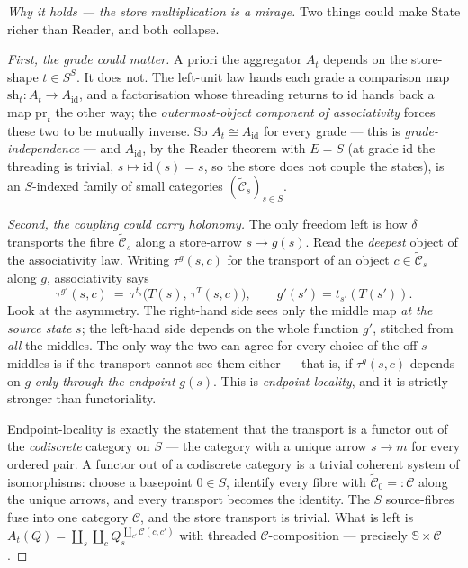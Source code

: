 \documentclass[11pt,a4paper]{book}
\newcommand{\id}{\mathrm{id}}
\theoremstyle{plain}
\theoremstyle{definition}
\theoremstyle{remark}
\begin{document}
\begin{proof}[Why it holds --- the store multiplication is a mirage]
Two things could make State richer than Reader, and both collapse.

\emph{First, the grade could matter.} A priori the aggregator $A_{t}$ depends on the store-shape
$t\in S^{S}$. It does not. The left-unit law hands each grade a comparison map
$\mathrm{sh}_{t}\colon A_{t}\to A_{\id}$, and a factorisation whose threading returns to $\id$ hands
back a map $\mathrm{pr}_{t}$ the other way; the \emph{outermost-object component of associativity}
forces these two to be mutually inverse. So $A_{t}\cong A_{\id}$ for every grade --- this is
\emph{grade-independence} --- and $A_{\id}$, by the Reader theorem with $E=S$ (at grade $\id$ the
threading is trivial, $s\mapsto\id(s)=s$, so the store does not couple the states), is an $S$-indexed
family of small categories $(\widetilde{\mathcal C}_{s})_{s\in S}$.

\emph{Second, the coupling could carry holonomy.} The only freedom left is how $\delta$ transports the
fibre $\widetilde{\mathcal C}_{s}$ along a store-arrow $s\to g(s)$. Read the \emph{deepest} object of
the associativity law. Writing $\tau^{g}(s,c)$ for the transport of an object
$c\in\widetilde{\mathcal C}_{s}$ along $g$, associativity says
\[
   \tau^{g'}(s,c)\ =\ \tau^{t_{s}}\!\bigl(T(s),\,\tau^{T}(s,c)\bigr),
   \qquad g'(s')=t_{s'}(T(s')).
\]
Look at the asymmetry. The right-hand side sees only the middle map \emph{at the source state} $s$;
the left-hand side depends on the whole function $g'$, stitched from \emph{all} the middles. The only
way the two can agree for every choice of the off-$s$ middles is if the transport cannot see them
either --- that is, if $\tau^{g}(s,c)$ depends on $g$ \emph{only through the endpoint} $g(s)$. This is
\emph{endpoint-locality}, and it is strictly stronger than functoriality.

Endpoint-locality is exactly the statement that the transport is a functor out of the
\emph{codiscrete} category on $S$ --- the category with a unique arrow $s\to m$ for every ordered pair.
A functor out of a codiscrete category is a trivial coherent system of isomorphisms: choose a
basepoint $0\in S$, identify every fibre with $\widetilde{\mathcal C}_{0}=:\mathcal C$ along the unique
arrows, and every transport becomes the identity. The $S$ source-fibres fuse into one category
$\mathcal C$, and the store transport is trivial. What is left is
$A_{t}(Q)=\coprod_{s}\coprod_{c}Q_{s}^{\,\coprod_{c'}\mathcal C(c,c')}$ with threaded
$\mathcal C$-composition ---
precisely $\mathbb S\times\mathcal C$.
\end{proof}
\end{document}
